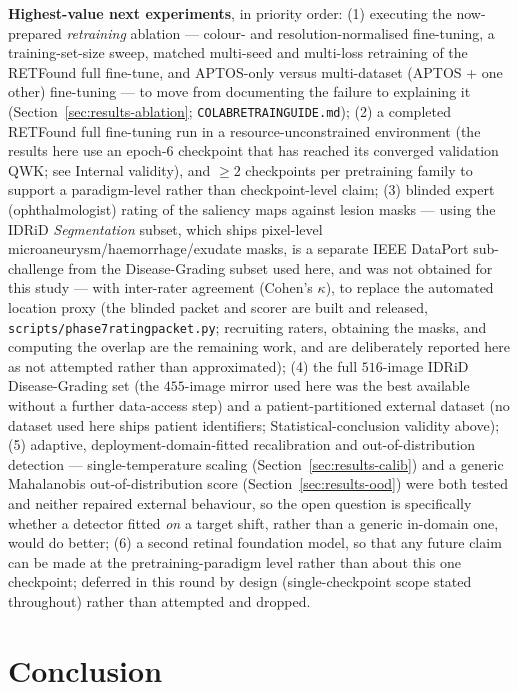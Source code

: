 \documentclass[journal]{IEEEtran}
\renewcommand{\_}{\origunderscore\allowbreak}
\begin{document}
\textbf{Highest-value next experiments}, in priority order:
(1) executing the now-prepared \emph{retraining} ablation --- colour- and
resolution-normalised fine-tuning, a training-set-size sweep, matched multi-seed
and multi-loss retraining of the RETFound full fine-tune, and APTOS-only versus
multi-dataset (APTOS + one other) fine-tuning --- to move from documenting the
failure to explaining it (Section~\ref{sec:results-ablation};
\texttt{COLAB\_RETRAIN\_GUIDE.md});
(2) a completed RETFound full fine-tuning run in a resource-unconstrained
environment (the results here use an epoch-6 checkpoint that has reached its
converged validation QWK; see Internal validity), and $\geq 2$ checkpoints per
pretraining family to support a paradigm-level rather than checkpoint-level claim;
(3) blinded expert (ophthalmologist) rating of the saliency maps against
lesion masks --- using the IDRiD \emph{Segmentation} subset, which ships
pixel-level microaneurysm/haemorrhage/exudate masks, is a separate IEEE
DataPort sub-challenge from the Disease-Grading subset used here, and was not
obtained for this study --- with inter-rater agreement (Cohen's $\kappa$), to
replace the automated location proxy (the blinded packet and scorer are built
and released, \texttt{scripts/\allowbreak{}phase7\_rating\_packet.py}; recruiting raters,
obtaining the masks, and computing the overlap are the remaining work, and are
deliberately reported here as not attempted rather than approximated);
(4) the full $516$-image IDRiD Disease-Grading set (the $455$-image mirror used
here was the best available without a further data-access step) and a
patient-partitioned external dataset (no dataset used here ships patient
identifiers; Statistical-conclusion validity above);
(5) adaptive, deployment-domain-fitted recalibration and out-of-distribution
detection --- single-temperature scaling (Section~\ref{sec:results-calib}) and a
generic Mahalanobis out-of-distribution score (Section~\ref{sec:results-ood})
were both tested and neither repaired external behaviour, so the open question
is specifically whether a detector fitted \emph{on} a target shift, rather than
a generic in-domain one, would do better;
(6) a second retinal foundation model, so that any future claim can be made at
the pretraining-paradigm level rather than about this one checkpoint; deferred
in this round by design (single-checkpoint scope stated throughout) rather than
attempted and dropped.


\section{Conclusion}
\label{sec:conclusion}
\end{document}
